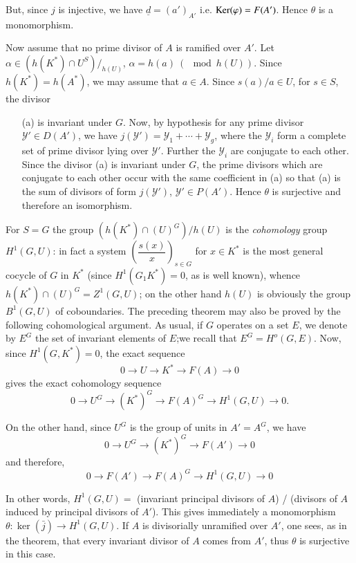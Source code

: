     \noindent
    But, since $j$ is injective, we have $\underline{d} = (a')_{A'} $
    i.e. $\operatorname{Ker} (\varphi) = F(A')$. Hence $\theta$ is a monomorphism. 
    
    Now assume that no prime divisor of $A$ is ramified over $A'$. Let
    $\alpha \in (h(K^*) \cap U^S) \Big/ _{h(U)}$, $\alpha = h(a) ~
    (\mod h(U))$. Since $h(K^*) = h(A^*)$, we may assume that $a \in
    A$. Since $s(a)/a \in U$, for $s \in S$, the divisor  
\begin{enumerate}
\item[(a)] is invariant under $G$. Now, by hypothesis for any prime
  divisor $\mathscr{Y}' \in D(A') $, we have $j (\mathscr{Y}' ) =
  \mathscr{Y}_1 + \cdots + \mathscr{Y}_g$, where the $\mathscr{Y}_i$
  form a complete set of prime divisor lying over $\mathscr{Y}'$. Further the
  $\mathscr{Y}_i$ are conjugate to each other. Since the divisor (a)
  is invariant under $G$, the prime divisors which are conjugate to
  each other occur with the same coefficient in (a) so that (a) is
  the sum of divisors of form $j (\mathscr{Y}')$, $\mathscr{Y}' \in
  P(A')$. Hence $\theta$ is surjective and therefore an isomorphism. 
\end{enumerate}  
      
\setcounter{rem}{0}
\begin{rem}
For $S = G$ the group $(h(K^*) \cap (U)^G) \big/ h(U)$ is the
{\em cohomology} group $H^1(G, U)$: in fact a system
$(\dfrac{s(x)}{x})_{s \in G}$ for $x \in K^*$ is the most general
cocycle of $G$ in $K^*$ (since $H^1 (G_1 K^*) = 0$, as is well known),
whence  $h(K^*) \cap (U)^G = Z^1 (G, U)$; on the other hand $h(U)$ is
obviously the group $B^1 (G, U)$ of coboundaries. The preceding
theorem may also be proved by the following cohomological argument. As
usual, if $G$ operates on a set $E$, we denote by $E^G$ the set of
invariant elements of $E$;\pageoriginale we recall that $E^G = H^o (G,
E)$. Now, 
since $H^1 (G, K^*) = 0$, the exact sequence 
$$
0 \to U \to K^* \to F(A) \to 0 
$$
gives the exact cohomology sequence
$$
0 \to U^G \to (K^*)^G \to F(A)^G \to H^1 (G, U) \to 0. 
$$
\end{rem}
  
  \noindent
  On the other hand, since $U^G$ is the group of units in $A' = A^G$,
  we have 
  $$
  0 \to U^G \to (K^*)^G \to F(A') \to 0
  $$
  and therefore,
  $$
  0 \to F(A') \to F(A)^G \to H^1 (G, U) \to 0
  $$
  
 \noindent
  In other words, $H^1 (G, U) = $ (invariant principal divisors of
  $A$) / (divisors of $A$ induced by principal divisors of $A'$). This
  gives immediately a monomorphism $\theta: \ker (\bar{j}) \to H^1
  (G, U)$. If $A$ is divisorially unramified over $A'$, one sees, as
  in the theorem, that every invariant divisor of $A$ comes from $A'$,
  thus $\theta$ is surjective in this case. 
  
